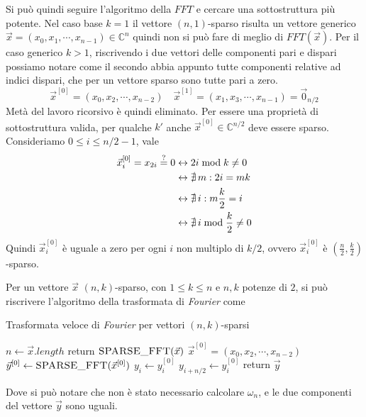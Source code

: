 Si può quindi seguire l'algoritmo della $FFT$ e cercare una sottostruttura più potente. Nel caso base $k=1$ il vettore $\left( n,1 \right)$-sparso risulta un vettore generico $\vec{x}=\left( x_0, x_1,\cdots, x _{n-1} \right) \in \mathbb{C}^n$ quindi non si può fare di meglio di $FFT\left( \vec{x} \right)$. Per il caso generico $k>1$, riscrivendo i due vettori delle componenti pari e dispari possiamo notare come il secondo abbia appunto tutte componenti relative ad indici dispari, che per un vettore sparso sono tutte pari a zero.
\begin{equation*}
    \vec{x}^{[0]}=\left( x_0, x_2,\cdots, x _{n-2} \right)
    \quad 
    \vec{x}^{[1]}=\left( x_1, x_3,\cdots, x _{n-1} \right) = \vec{0}_{n/2}
\end{equation*}
Metà del lavoro ricorsivo è quindi eliminato.
Per essere una proprietà di sottostruttura valida, per qualche $k'$ anche $\vec{x}^{[0]} \in \mathbb{C}^{n/2}$ deve essere sparso. Consideriamo $0 \leq i \leq n/2-1$, vale
\begin{align*}
    \vec{x}_i^{[0]} = x_{2i} \overset{?}{=} 0 
    & \leftrightarrow
    2i \bmod k \neq 0
    \\
    & \leftrightarrow
    \nexists \, m : 2i = mk
    \\
    & \leftrightarrow
    \nexists \, i : m\frac{k}{2} = i
    \\
    & \leftrightarrow
    \nexists \, i \bmod \frac{k}{2} \neq 0
\end{align*}
Quindi $\vec{x}_i^{[0]}$ è uguale a zero per ogni $i$ non multiplo di $k/2$, ovvero $\vec{x}_i^{[0]}$ è $\left( \frac{n}{2}, \frac{k}{2} \right)$-sparso.

Per un vettore $\vec{x}$ $(n,k)$-sparso, con $1 \leq k \leq n$ e $n,k$ potenze di $2$, si può riscrivere l'algoritmo della trasformata di \textit{Fourier} come
\begin{algorithm}[H]
    \caption{Trasformata veloce di \textit{Fourier} per vettori $(n,k)$-sparsi}\label{alg:fftsparsa}
\begin{algorithmic}[1]
        \State $n \gets \vec{x}.length$
            \State return $\Call{SPARSE\_FFT}{\vec{x}}$
        \EndIf
        \State $\vec{x}^{[0]}=\left( x_0, x_2,\cdots, x _{n-2} \right)$
        \State $\vec{y}^{[0]} \gets \Call{SPARSE\_FFT}{\vec{x}^{[0]}}$
            \State $y_{i} \gets y_{i}^{[0]}$
            \State $y_{i+n/2} \gets y_{i}^{[0]}$
        \EndFor
        \State return $\vec{y}$
    \EndProcedure
\end{algorithmic}
\end{algorithm}
Dove si può notare che non è stato necessario calcolare $\omega_n$, e le due componenti del vettore $\vec{y}$ sono uguali.

